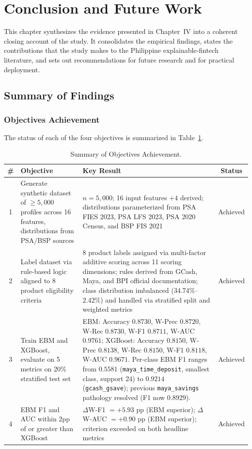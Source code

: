 \documentclass[journal]{./IEEE/IEEEtran}
\begin{document}
\section{Conclusion and Future Work}
This chapter synthesizes the evidence presented in Chapter~IV into a coherent closing account of the study. It consolidates the empirical findings, states the contributions that the study makes to the Philippine explainable-fintech literature, and sets out recommendations for future research and for practical deployment.

\subsection{Summary of Findings}

\subsubsection{Objectives Achievement}

The status of each of the four objectives is summarized in Table~\ref{tab:obj}.

\begin{table}[h]
    \centering
    \caption{Summary of Objectives Achievement.}
    \label{tab:obj}
    \footnotesize
    \begin{tabular}{|c|p{5.5cm}|p{7.0cm}|c|}
        \hline
        \textbf{\#} & \textbf{Objective} & \textbf{Key Result} & \textbf{Status} \\
        \hline
        1 & Generate synthetic dataset of $\geq 5{,}000$ profiles across 16 features, distributions from PSA/BSP sources & $n = 5{,}000$; 16 input features $+ 4$ derived; distributions parameterized from PSA FIES 2023, PSA LFS 2023, PSA 2020 Census, and BSP FIS 2021 & Achieved \\
        \hline
        2 & Label dataset via rule-based logic aligned to 8 product eligibility criteria & 8 product labels assigned via multi-factor additive scoring across 11 scoring dimensions; rules derived from GCash, Maya, and BPI official documentation; class distribution imbalanced (34.74\%--2.42\%) and handled via stratified split and weighted metrics & Achieved \\
        \hline
        3 & Train EBM and XGBoost, evaluate on 5 metrics on 20\% stratified test set & EBM: Accuracy $0.8730$, W-Prec $0.8720$, W-Rec $0.8730$, W-F1 $0.8711$, W-AUC $0.9761$; XGBoost: Accuracy $0.8150$, W-Prec $0.8138$, W-Rec $0.8150$, W-F1 $0.8118$, W-AUC $0.9671$. Per-class EBM F1 ranges from $0.5581$ (\texttt{maya\_time\_deposit}, smallest class, support $24$) to $0.9214$ (\texttt{gcash\_gsave}); previous \texttt{maya\_savings} pathology resolved (F1 now $0.8929$). & Achieved \\
        \hline
        4 & EBM F1 and AUC within 2pp of or greater than XGBoost & $\Delta$W-F1 $= +5.93$ pp (EBM superior); $\Delta$W-AUC $= +0.90$ pp (EBM superior); criterion exceeded on both headline metrics & Achieved \\
        \hline
    \end{tabular}
\end{table}
\end{document}
